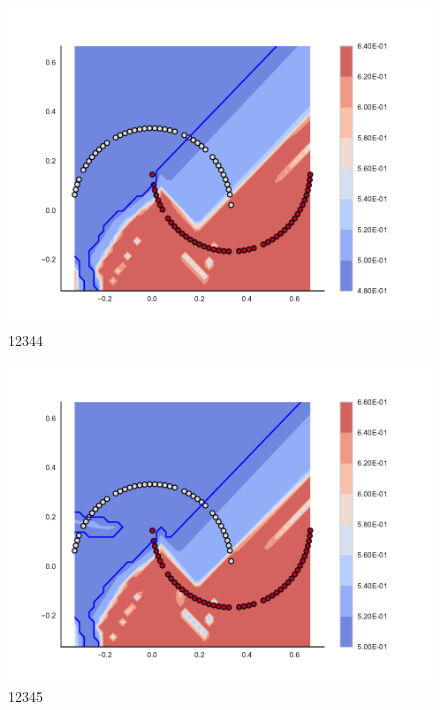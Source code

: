 \begin{subfigure}[b]{0.09\textwidth}
    \includegraphics[clip, trim=2.35cm 1.75cm 4.5cm 0cm,width=\textwidth]{img/convergence/12344.pdf}
    \caption{12344}
    \label{fig:convergence_12344}
\end{subfigure}
%
\begin{subfigure}[b]{0.09\textwidth}
    \includegraphics[clip, trim=2.35cm 1.75cm 4.5cm 0cm,width=\textwidth]{img/convergence/12345.pdf}
    \caption{12345}
    \label{fig:convergence_12345}
\end{subfigure}
%
